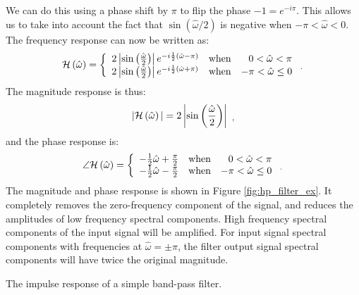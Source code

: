\noindent We can do this using a phase shift by $\pi$ to flip the phase $-1 = e^{-i\pi}$. This allows us to take into account the fact that $\sin(\hat{\omega}/2)$ is negative when $-\pi < \hat{\omega} < 0$. The frequency response can now be written as:
\begin{equation}
\mathcal{H}\left(\hat{\omega}\right) = \left\{ 
  \begin{array}{llr}
    2\left|\sin\left(\frac{\hat{\omega}}{2}\right)\right|
    e^{-i\frac{1}{2}(\hat{\omega}-\pi)} & \mathrm{when} & 0
    < \hat{\omega} < \pi \\
    2\left|\sin\left(\frac{\hat{\omega}}{2}\right)\right|
    e^{-i\frac{1}{2}(\hat{\omega}+\pi)} & \mathrm{when} & -\pi
    < \hat{\omega} \le 0 \end{array} \,\, _.
\right.
\end{equation}
The magnitude response is thus:
\begin{equation}
|\mathcal{H}\left(\hat{\omega}\right)|=2\left|\sin\left(\frac{\hat{\omega}}{2}\right)\right| \,\, _,
\end{equation} 
and the phase response is:
\begin{equation}
\angle \mathcal{H}\left(\hat{\omega}\right) = \left\{ 
  \begin{array}{lcr}
    -\frac{1}{2}\hat{\omega} + \frac{\pi}{2}  & \mathrm{when} & 0 < \hat{\omega} < \pi \\
    -\frac{1}{2}\hat{\omega} - \frac{\pi}{2}  & \mathrm{when} & -\pi < \hat{\omega} \le 0 \\
  \end{array} \,\, _.
\right.
\end{equation}
The magnitude and phase response is shown in
Figure \ref{fig:hp_filter_ex}. It completely removes the zero-frequency
component of the signal, and reduces the amplitudes of low frequency
spectral components. High frequency spectral components of the input
signal will be amplified. For input signal spectral components with
frequencies at $\hat{\omega}=\pm \pi$, the filter output signal
spectral components will have twice the original magnitude.

\begin{marginfigure}
\begin{center}
\end{center}
\caption{The impulse response of a simple band-pass filter.}
\label{fig:example0_bpf_h}
\end{marginfigure}

